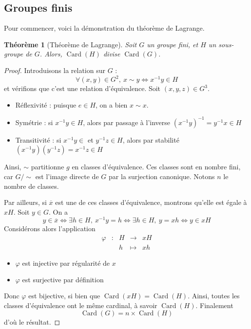 \documentclass[french]{book}
\newcommand{\inv}{^{-1}}
\theoremstyle{plain}
\newtheorem{thm}{Théorème}[chapter]
\theoremstyle{definition}
\theoremstyle{remark}
\DeclareMathOperator{\card}{Card}
\begin{document}
\subsection{Groupes finis}
Pour commencer, voici la démonstration du théorème de Lagrange.
\begin{thm}[Théorème de Lagrange]
	Soit $G$ un groupe fini, et $H$ un sous-groupe de $G$. Alors, $\card(H)$ divise $\card(G)$.
\end{thm}
\begin{proof}
	Introduisons la relation sur $G$ : $$\forall(x,y)\in G^2,\ x\sim y \iff x\inv y \in H$$ et vérifions que c'est une relation d'équivalence. Soit $(x,y,z)\in G^3$.
	\begin{itemize}
		\item Réflexivité : puisque $e\in H$, on a bien $x\sim x$.
		\item Symétrie : si $x\inv y\in H$, alors par passage à l'inverse $(x\inv y)\inv=y\inv x\in H$
		\item Transitivité : si $x\inv y\in $ et $y\inv z\in H$, alors par stabilité $(x\inv y)(y\inv z)=x\inv z\in H$ 
	\end{itemize}
	Ainsi, $\sim$ partitionne $g$ en classes d'équivalence. Ces classes sont en nombre fini, car $G/\sim$ est l'image directe de $G$ par la surjection canonique. Notons $n$ le nombre de classes. \par Par ailleurs, si $\overline{x}$ est une de ces classes d'équivalence, montrons qu'elle est égale à $xH$. Soit $y\in G$. On a $$y\in\overline{x}\iff\exists h\in H,\ x\inv y=h \iff \exists h\in H,\ y=xh \iff y\in xH$$ Considérons alors l'application $$\begin{array}{ccccc} \varphi &:&H&\rightarrow&xH \\ &&h&\mapsto&xh\end{array}$$
	\begin{itemize}
		\item $\varphi$ est injective par régularité de $x$
		\item $\varphi$ est surjective par définition
	\end{itemize}
	Donc $\varphi$ est bijective, si bien que $\card(xH)=\card(H)$. Ainsi, toutes les classes d'équivalence ont le même cardinal, à savoir $\card(H)$. Finalement $$\card(G)=n\times\card(H)$$d'où le résultat.
\end{proof}
\end{document}

